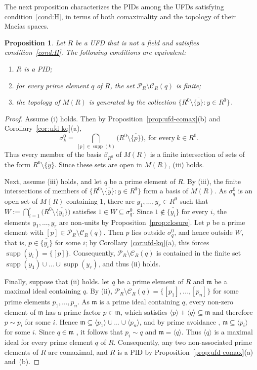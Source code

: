 \documentclass[12pt,reqno,a4paper]{amsart}
\newcommand{\Pe}{\mathcal{P}}
\newcommand{\m}{\mathfrak{m}}
\newcommand{\clo}[1]{\overline{\{#1\}}}
\DeclareMathOperator{\supp}{supp}
\theoremstyle{plain}
\newtheorem{proposition}[theorem]{Proposition}
\theoremstyle{definition}
\begin{document}
The next proposition characterizes the PIDs among the UFDs satisfying condition~\ref{cond:H}, in terms of both comaximality and the topology of their Mac\'ias spaces.
\begin{proposition}\label{prop:pid-char}
Let $R$ be a UFD that is not a field and satisfies condition~\ref{cond:H}. The following conditions are equivalent:
\begin{enumerate}[label=\textup{(\roman*)}]
\item $R$ is a PID;
\item for every prime element $q$ of $R$, the set $\Pe_R\setminus\mathcal{C}_R(q)$ is finite;
\item the topology of $M(R)$ is generated by the collection $\{R^0\setminus\clo{y}:y\in R^0\}$.
\end{enumerate}
\end{proposition}
\begin{proof}
Assume (i) holds. Then by Proposition~\ref{prop:ufd-comax}(b) and Corollary~\ref{cor:ufd-kq}(a), \[\sigma_k^0=\bigcap\limits_{[p]\in\supp(k)}\bigl(R^0\setminus\clo{p}\bigr),~\text{for every}~ k\in R^0.\] Thus every member of the basis $\beta_{R^0}$ of $M(R)$ is a finite intersection of sets of the form $R^0\setminus\clo{y}$. Since these sets are open in $M(R)$, (iii) holds.

Next, assume (iii) holds, and let $q$ be a prime element of $R$. By (iii), the finite intersections of members of $\{R^0\setminus\clo{y}:y\in R^0\}$ form a basis of $M(R)$. As $\sigma_q^0$ is an open set of $M(R)$ containing $1$, there are $y_1,\dots,y_r\in R^0$ such that $W:=\bigcap\limits_{i=1}^{r}\bigl(R^0\setminus\clo{y_i}\bigr)$ satisfies $1\in W\subseteq\sigma_q^0$. Since $1\notin\clo{y_i}$ for every $i$, the elements $y_1,\dots,y_r$ are non-units by Proposition~\ref{prop:closure}. Let $p$ be a prime element with $[p]\in\Pe_R\setminus\mathcal{C}_R(q)$. Then $p$ lies outside $\sigma_q^0$, and hence outside $W$, that is, $p\in\clo{y_i}$ for some $i$; by Corollary~\ref{cor:ufd-kq}(a), this forces $\supp(y_i)=\{[p]\}$. Consequently, $\Pe_R\setminus\mathcal{C}_R(q)$ is contained in the finite set $\supp(y_1)\cup\dots\cup\supp(y_r)$, and thus (ii) holds.

Finally, suppose that (ii) holds. let $q$ be a prime element of $R$ and $\m$ be a maximal ideal containing $q$. By (ii), $\Pe_R\setminus\mathcal{C}_R(q)=\{[p_1],\dots,[p_n]\}$ for some prime elements $p_1,\dots,p_n$. As $\m$ is a prime ideal containing $q$, every non-zero element of $\m$ has a prime factor $p\in\m$, which satisfies $\langle p\rangle+\langle q\rangle\subseteq\m$ and therefore $p\sim p_i$ for some $i$. Hence $\m\subseteq\langle p_1\rangle\cup\dots\cup\langle p_n\rangle$, and by prime avoidance \cite[Proposition~1.11]{AtiyahMacdonald}, $\m\subseteq\langle p_i\rangle$ for some $i$. Since $q\in\m$ , it follows that $p_i\sim q$ and $\m=\langle q\rangle$. Thus $\langle q\rangle$ is a maximal ideal for every prime element $q$ of $R$. Consequently, any two non-associated prime elements of $R$ are comaximal, and $R$ is a PID by Proposition~\ref{prop:ufd-comax}(a) and~(b).
\end{proof}
\end{document}
